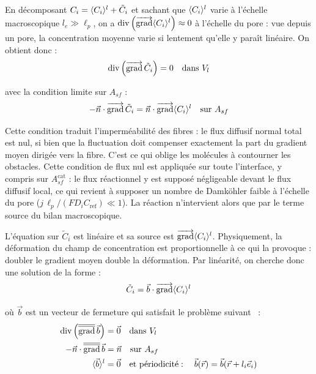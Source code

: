 En décomposant $C_i = \langle C_i \rangle^l + \tilde{C}_i$ et sachant que
$\langle C_i \rangle^l$ varie à l'échelle macroscopique $l_e \gg \ell_p$,
on a $\operatorname{div}\left(\mathop{\overrightarrow{\operatorname{grad}}}\nolimits\langle C_i \rangle^l\right) \approx 0$ à l'échelle du pore : vue
depuis un pore, la concentration moyenne varie si lentement qu'elle y paraît
linéaire. On obtient donc :
\begin{equation}
\operatorname{div}\left(\mathop{\overrightarrow{\operatorname{grad}}}\nolimits \tilde{C}_i\right) = 0 \quad \text{dans } V_l
\end{equation}

avec la condition limite sur $A_{sf}$ :
\begin{equation}
-\vec{n} \cdot \mathop{\overrightarrow{\operatorname{grad}}}\nolimits\tilde{C}_i = \vec{n} \cdot \mathop{\overrightarrow{\operatorname{grad}}}\nolimits\langle C_i \rangle^l \quad \text{sur } A_{sf}
\end{equation}

Cette condition traduit l'imperméabilité des fibres : le flux diffusif normal
total est nul, si bien que la fluctuation doit compenser exactement la part du
gradient moyen dirigée vers la fibre. C'est ce qui oblige les molécules à
contourner les obstacles. Cette condition de flux nul est appliquée sur toute
l'interface, y compris sur
$A_{sf}^{\mathrm{cat}}$ : le flux réactionnel y est supposé négligeable devant le flux
diffusif local, ce qui revient à supposer un nombre de Damköhler faible à l'échelle du pore
($j\,\ell_p/(F D_i C_{\text{ref}}) \ll 1$). La réaction n'intervient alors que par le
terme source du bilan macroscopique.

L'équation sur $\tilde{C}_i$ est linéaire et sa source est $\mathop{\overrightarrow{\operatorname{grad}}}\nolimits\langle C_i \rangle^l$.
Physiquement, la déformation du champ de concentration est proportionnelle à
ce qui la provoque : doubler le gradient moyen double la déformation. Par
linéarité, on cherche donc une solution de la forme :
\begin{equation}
\tilde{C}_i = \vec{b}\cdot\mathop{\overrightarrow{\operatorname{grad}}}\nolimits\langle C_i \rangle^l
\end{equation}

où $\vec{b}$ est un vecteur de fermeture qui satisfait le problème suivant~\cite{whitakerMethodVolumeAveraging1999, korneevDataDrivenMultiscaleFramework2020} :
\begin{align}
\operatorname{div}\left(\mathop{\overline{\overline{\operatorname{grad}}}}\nolimits \vec{b}\right) &= \vec{0} \quad \text{dans } V_l \\
-\vec{n}\cdot\mathop{\overline{\overline{\operatorname{grad}}}}\nolimits\vec{b} &= \vec{n} \quad \text{sur } A_{sf}\\
\langle \vec{b} \rangle^l &= \vec{0} \quad \text{et périodicité} : \quad \vec{b}(\vec{r}) = \vec{b}(\vec{r} + l_i \vec{e}_i)
\end{align}

